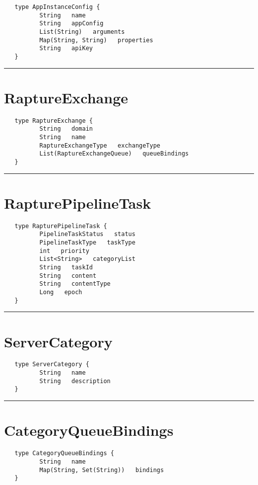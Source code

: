 \begin{verbatim}
   type AppInstanceConfig {
          String   name
          String   appConfig
          List(String)   arguments
          Map(String, String)   properties
          String   apiKey
   }
\end{verbatim}

\rule{15cm}{2pt}
\section{RaptureExchange}
\label{type:RaptureExchange}

\begin{verbatim}
   type RaptureExchange {
          String   domain
          String   name
          RaptureExchangeType   exchangeType
          List(RaptureExchangeQueue)   queueBindings
   }
\end{verbatim}

\rule{15cm}{2pt}
\section{RapturePipelineTask}
\label{type:RapturePipelineTask}

\begin{verbatim}
   type RapturePipelineTask {
          PipelineTaskStatus   status
          PipelineTaskType   taskType
          int   priority
          List<String>   categoryList
          String   taskId
          String   content
          String   contentType
          Long   epoch
   }
\end{verbatim}

\rule{15cm}{2pt}
\section{ServerCategory}
\label{type:ServerCategory}

\begin{verbatim}
   type ServerCategory {
          String   name
          String   description
   }
\end{verbatim}

\rule{15cm}{2pt}
\section{CategoryQueueBindings}
\label{type:CategoryQueueBindings}

\begin{verbatim}
   type CategoryQueueBindings {
          String   name
          Map(String, Set(String))   bindings
   }
\end{verbatim}

